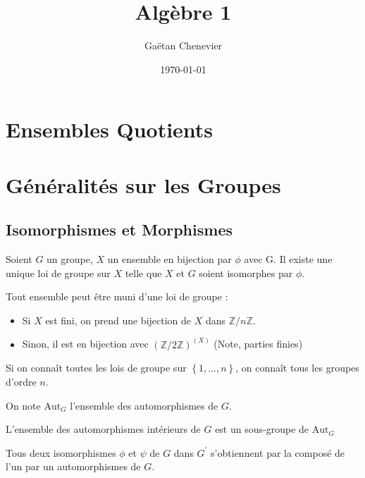 \documentclass{cours}
\title{Algèbre 1}
\author{Gaëtan Chenevier}
\date{\today}
\begin{document}
\section{Ensembles Quotients}
\section{Généralités sur les Groupes}
\subsection{Isomorphismes et Morphismes}
\begin{theorem}
    Soient $G$ un groupe, $X$ un ensemble en bijection par $\phi$ avec G. Il existe une unique loi de groupe sur $X$ telle que $X$ et $G$ soient isomorphes par $\phi$.
\end{theorem}
\begin{corollary}
    Tout ensemble peut être muni d'une loi de groupe : 
    \begin{itemize}
        \item Si $X$ est fini, on prend une bijection de $X$ dans $\mathbb{Z}/n\mathbb{Z}$.
        \item Sinon, il est en bijection avec $\left(\mathbb{Z}/2\mathbb{Z}\right)^{(X)}$ (Note, parties finies)
    \end{itemize}
\end{corollary}
\begin{remark}
    Si on connaît toutes les lois de groupe sur $\left\{1, \ldots, n\right\}$, on connaît tous les groupes d'ordre $n$.
\end{remark}
\begin{definition}
    On note $\text{Aut}_{G}$ l'ensemble des automorphismes de $G$.
\end{definition}
\begin{remark}
    L'ensemble des automorphismes intérieurs de $G$ est un sous-groupe de $\text{Aut}_{G}$
\end{remark}
\begin{remark}
    Tous deux isomorphismes $\phi$ et $\psi$ de $G$ dans $G^{'}$ s'obtiennent par la composé de l'un par un automorphismes de $G$.
\end{remark}
\end{document}
